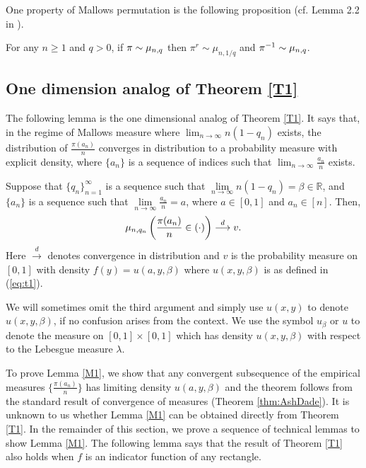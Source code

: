 One property of Mallows permutation is the following proposition (cf. Lemma 2.2 in \cite{Naya}).
\begin{proposition}\label{P3}
For any $n \ge 1$ and $q > 0$, if $\pi \sim \mu_{n, q}$ then $\pi^r \sim \mu_{n, 1/q}$ and $\pi^{-1} \sim \mu_{n, q}$.
\end{proposition}



\subsection{One dimension analog of Theorem \ref{T1}}

The following lemma is the one dimensional analog of Theorem \ref{T1}. It says that, in the regime of Mallows measure where $\lim_{n \to \infty}n(1-q_n)$ exists, the distribution of $\frac{\pi(a_n)}{n}$ converges in distribution to a probability measure with explicit density, where $\{a_n\}$ is a sequence of indices such that $\lim_{n \to \infty}\frac{a_n}{n}$ exists.

\begin{lemma}\label{M1}
Suppose that $\{q_n\}_{n=1}^{\infty}$ is a sequence such that $\lim\limits_{n\to\infty} n (1-q_n) = \beta \in \mathbb{R}$, and $\{a_n\}$ is a sequence such that $\lim\limits_{n \to \infty} \frac{a_n}{n} = a$, where $a \in [0, 1]$ and $a_n \in [n]$. Then,
\[
\mu_{n, q_n} \left( \frac{\pi(a_n)}{n} \in (\cdot) \right) \overset{d}{\longrightarrow} v.
\]
Here $\overset{d}{\longrightarrow}$ denotes convergence in distribution and $v$ is the probability measure on $[0,1]$ with density $f(y) = u(a, y, \beta)$ where $u(x, y, \beta)$ is as defined in (\ref{eq:t1}).
\end{lemma}


We will sometimes omit the third argument and simply use $u(x, y)$ to denote $u(x, y, \beta)$, if no confusion arises from the context. We use the symbol $u_{\beta}$ or $u$ to denote the measure on $[0, 1]\times[0,1]$ which has density $u(x, y, \beta)$ with respect to the Lebesgue measure $\lambda$.

To prove Lemma \ref{M1}, we show that any convergent subsequence of the empirical measures $\{\frac{\pi(a_n)}{n} \}$ has limiting density $u(a, y, \beta)$ and the theorem follows from the standard result of convergence of measures (Theorem \ref{thm:AshDade}). It is unknown to us whether Lemma \ref{M1} can be obtained directly from Theorem \ref{T1}. In the remainder of this section, we prove a sequence of technical lemmas to show Lemma \ref{M1}. The following lemma says that the result of Theorem \ref{T1} also holds when $f$ is an indicator function of any rectangle.


